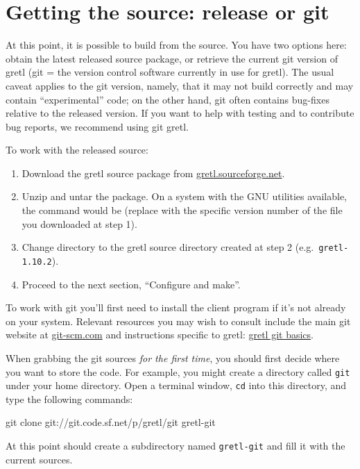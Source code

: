\section{Getting the source: release or git}

At this point, it is possible to build from the source.  You have two
options here: obtain the latest released source package, or retrieve
the current git version of gretl (git = the version control software
currently in use for gretl).  The usual caveat applies to the git
version, namely, that it may not build correctly and may contain
``experimental'' code; on the other hand, git often contains bug-fixes
relative to the released version.  If you want to help with testing
and to contribute bug reports, we recommend using git gretl.

To work with the released source:
\begin{enumerate}
\item Download the gretl source package from
  \href{http://gretl.sourceforge.net/}{gretl.sourceforge.net}.
\item Unzip and untar the package.  On a system with the GNU utilities
  available, the command would be 
  (replace  with the specific version number of the file you
  downloaded at step 1).
\item Change directory to the gretl source directory created at step 2
  (e.g.\ \verb+gretl-1.10.2+).
\item Proceed to the next section, ``Configure and make''.
\end{enumerate}

To work with git you'll first need to install the  client
program if it's not already on your system.  Relevant resources you
may wish to consult include the main git website at
\href{https://git-scm.com/}{git-scm.com} and instructions specific to
gretl:
\href{http://ricardo.ecn.wfu.edu/~cottrell/gretl-git-basics.html}{gretl
  git basics}.

When grabbing the git sources \textit{for the first time}, you should
first decide where you want to store the code.  For example, you might
create a directory called \texttt{git} under your home directory.
Open a terminal window, \texttt{cd} into this directory, and type
the following commands:
%
\begin{code}
git clone git://git.code.sf.net/p/gretl/git gretl-git
\end{code}
%
At this point  should create a subdirectory named
\texttt{gretl-git} and fill it with the current sources.

